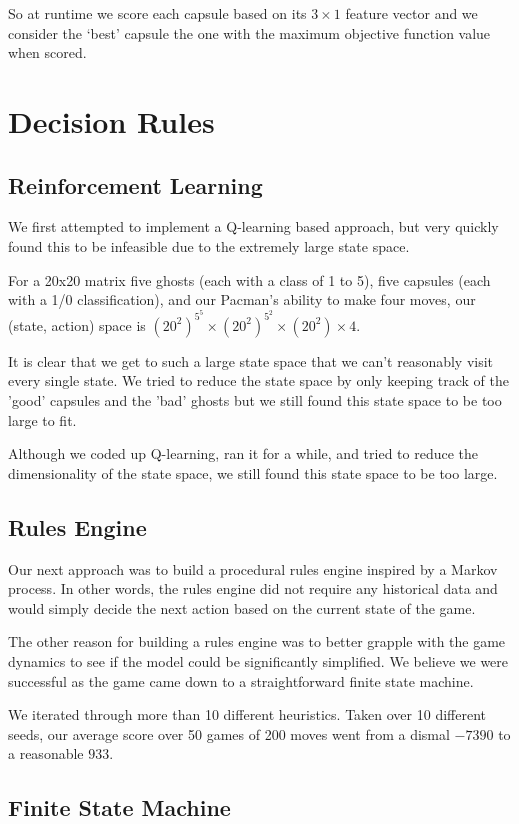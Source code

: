 \documentclass[11pt, oneside]{article}   	%
\begin{document}
So at runtime we score each capsule based on its $3\times1$ feature vector and we consider the `best' capsule the one with the maximum objective function value when scored.

\section{Decision Rules}

\subsection{Reinforcement Learning}
We first attempted to implement a Q-learning based approach\cite{sutton}, but very quickly found this to be infeasible due to the extremely large state space.

For a 20x20 matrix five ghosts (each with a class of 1 to 5), five capsules (each with a 1/0 classification), and our Pacman's ability to make four moves, our (state, action) space is $(20^2)^{5^5} \times (20^2)^{5^2} \times (20^2) \times 4$.

It is clear that we get to such a large state space that we can't reasonably visit every single state. We tried to reduce the state space by only keeping track of the 'good' capsules and the 'bad' ghosts but we still found this state space to be too large to fit. 

Although we coded up Q-learning, ran it for a while, and tried to reduce the dimensionality of the state space, we still found this state space to be too large.

\subsection{Rules Engine}
Our next approach was to build a procedural rules engine inspired by a Markov process. In other words, the rules engine did not require any historical data and would simply decide the next action based on the current state of the game.

The other reason for building a rules engine was to better grapple with the game dynamics to see if the model could be significantly simplified. We believe we were successful as the game came down to a straightforward finite state machine. 

We iterated through more than 10 different heuristics. Taken over 10 different seeds, our average score over 50 games of 200 moves went from a dismal $-7390$ to a reasonable $933$.

\subsection{Finite State Machine}
\end{document}

